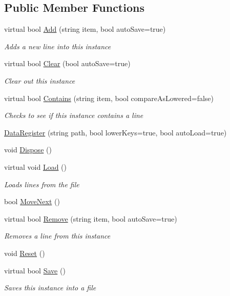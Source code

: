 \subsection*{Public Member Functions}
\begin{DoxyCompactItemize}
\item 
virtual bool \hyperlink{classOTA_1_1Misc_1_1DataRegister_aae585a0a0da16c15edeeea48bdf46575}{Add} (string item, bool auto\+Save=true)
\begin{DoxyCompactList}\small\item\em Adds a new line into this instance \end{DoxyCompactList}\item 
virtual bool \hyperlink{classOTA_1_1Misc_1_1DataRegister_a4a635888348e0c92fd134854947f3022}{Clear} (bool auto\+Save=true)
\begin{DoxyCompactList}\small\item\em Clear out this instance \end{DoxyCompactList}\item 
virtual bool \hyperlink{classOTA_1_1Misc_1_1DataRegister_a82ff1cfa0eac744d1981667f530a5a34}{Contains} (string item, bool compare\+As\+Lowered=false)
\begin{DoxyCompactList}\small\item\em Checks to see if this instance contains a line \end{DoxyCompactList}\item 
\hyperlink{classOTA_1_1Misc_1_1DataRegister_a9c5281ecdfbadc5af6dfa323f1d4d7eb}{Data\+Register} (string path, bool lower\+Keys=true, bool auto\+Load=true)
\item 
void \hyperlink{classOTA_1_1Misc_1_1DataRegister_a6e2d745cdb7a7b983f861ed6a9a541a7}{Dispose} ()
\item 
virtual void \hyperlink{classOTA_1_1Misc_1_1DataRegister_a64cc1ba6b9c12fa65ad7f4dcf402f59f}{Load} ()
\begin{DoxyCompactList}\small\item\em Loads lines from the file \end{DoxyCompactList}\item 
bool \hyperlink{classOTA_1_1Misc_1_1DataRegister_ad5316c283894d57be1450edab878aed0}{Move\+Next} ()
\item 
virtual bool \hyperlink{classOTA_1_1Misc_1_1DataRegister_a7b0f6ae2194973fc320202841b5ec828}{Remove} (string item, bool auto\+Save=true)
\begin{DoxyCompactList}\small\item\em Removes a line from this instance \end{DoxyCompactList}\item 
void \hyperlink{classOTA_1_1Misc_1_1DataRegister_a372de693ad40b3f42839c8ec6ac845f4}{Reset} ()
\item 
virtual bool \hyperlink{classOTA_1_1Misc_1_1DataRegister_a2cb804d48eec8fd6e00a1ebb043333a9}{Save} ()
\begin{DoxyCompactList}\small\item\em Saves this instance into a file \end{DoxyCompactList}\end{DoxyCompactItemize}
